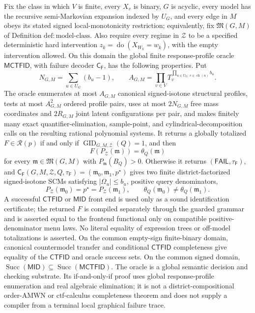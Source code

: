Fix the class in which \(V\) is finite, every \(X_v\) is binary, \(G\) is acyclic, every model has the recursive semi-Markovian expansion indexed by \(U_G\), and every edge in \(M\) obeys its stated signed local-monotonicity restriction; equivalently, fix \(\mathfrak M(G,M)\) of Definition \(\mathrm{def:model\text{-}class}\).  Also require every regime in \(\mathcal Z\) to be a specified deterministic hard intervention \(z_k=\operatorname{do}(X_{W_k}=w_k)\), with the empty intervention allowed.  On this domain the global finite response-profile oracle \(\mathsf{MCTFID}\), with failure decoder \(\mathsf C_{\mathsf F}\), has the following properties.  Put
\[
 N_{G,M}=\sum_{u\in U_G}(b_u-1),
 \qquad
 A_{G,M}=\prod_{v\in V}T_v^{\prod_{u\in U_G:\,v\in\operatorname{ch}(u)}b_u}.
\]
The oracle enumerates at most \(A_{G,M}\) canonical signed-isotone structural profiles, tests at most \(A_{G,M}^2\) ordered profile pairs, uses at most \(2N_{G,M}\) free mass coordinates and \(2R_{G,M}\) joint latent configurations per pair, and makes finitely many exact quantifier-elimination, sample-point, and cylindrical-decomposition calls on the resulting rational polynomial systems.  It returns a globally totalized \(F\in\mathcal R(p)\) if and only if \(\operatorname{GID}_{G,M,\mathcal Z}(Q)=1\), and then
\[
 F(P_{\mathcal Z}(\mathfrak m))=\theta_Q(\mathfrak m)
\]
for every \(\mathfrak m\in\mathfrak M(G,M)\) with \(P_{\mathfrak m}(B_Q)>0\).  Otherwise it returns \((\mathsf{FAIL},\tau_{\mathsf F})\), and \(\mathsf C_{\mathsf F}(G,M,\mathcal Z,Q,\tau_{\mathsf F})=(\mathfrak m_0,\mathfrak m_1,p^{\star})\) gives two finite district-factorized signed-isotone SCMs satisfying \(|\Omega_u|\le b_u\), positive query denominators,
\[
 P_{\mathcal Z}(\mathfrak m_0)=p^{\star}=P_{\mathcal Z}(\mathfrak m_1),
 \qquad
 \theta_Q(\mathfrak m_0)\ne\theta_Q(\mathfrak m_1).
\]
A successful \(\mathsf{CTFID}\) or \(\mathsf{MID}\) front end is used only as a sound identification certificate; the returned \(F\) is compiled separately through the guarded grammar and is asserted equal to the frontend functional only on compatible positive-denominator menu laws.  No literal equality of expression trees or off-model totalizations is asserted.  On the common empty-sign finite-binary domain, canonical countermodel transfer and conditional \(\mathsf{CTFID}\) completeness give equality of the \(\mathsf{CTFID}\) and oracle success sets.  On the common signed domain, \(\operatorname{Succ}(\mathsf{MID})\subseteq\operatorname{Succ}(\mathsf{MCTFID})\).  The oracle is a global semantic decision and checking substrate.  Its if-and-only-if proof uses global response-profile enumeration and real algebraic elimination; it is not a district-compositional order-AMWN or ctf-calculus completeness theorem and does not supply a compiler from a terminal local graphical failure trace.